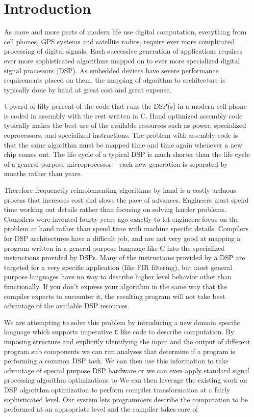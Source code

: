\section{Introduction}
As more and more parts of modern life use digital computation, everything from cell phones, GPS systems
and satellite radios, require ever more complicated processing of digital signals. 
Each successive generation of applications requires ever more sophisticated algorithms mapped 
on to ever more specialized digital signal processors (DSP). As 
embedded devices have severe performance requirements placed on them,
the mapping of algorithm to architecture is typically done by hand at great cost and great expense.

Upward of fifty percent of the code that runs the DSP(s) in a modern cell phone is coded in assembly
with the rest written in C. Hand optimized assembly code typically makes the best use of the 
available resources such as power, specialized coprocessors, and specialized instructions.
The problem with assembly code is that the same algorithm must be mapped time and time again 
whenever a new chip comes out. The life cycle of a typical DSP is much shorter than the life
cycle of a general purpose microprocessor -- each new generation is separated by months rather
than years.
 
Therefore frequenctly reimplementing algorithms by hand is a costly arduous process that 
increases cost and slows the pace of advances. Engineers must spend time working out details rather 
than focusing on solving harder problems. Compilers were invented fourty years ago 
exactly to let engineers focus on the problem at hand rather than spend time with 
machine specific details. Compilers for DSP architectures have a difficult job, and are not
very good at mapping a program written in a general purpose language like C into the specialized 
instructions provided by DSPs. Many of the instructions provided by a DSP are targeted 
for a very specific application (like FIR filtering), but most general purpose languages have
no way to describe higher level behavior other than functionally. If you don't express
your algorithm in the same way that the compiler expects to encounter it, the resulting
program will not take best advantage of the available DSP resources.

We are attempting to solve this problem by introducing a new domain specific language which
supports imperative {\tt C} like code to describe computation. By imposing structure and
explicitly identifying the input and the output of different program sub components
we can run analyses that determine if a program is performing a common DSP task.  
We can then use this information to take advantage of special purpose DSP hardware
or we can even apply standard signal processing algorithm optimizations to 
We can then leverage the existing work on DSP algorithm optimization to perform compiler transformation
at a fairly sophisticated level. Our system lets programmers describe the
computation to be performed at an appropriate level and the compiler takes care of 


